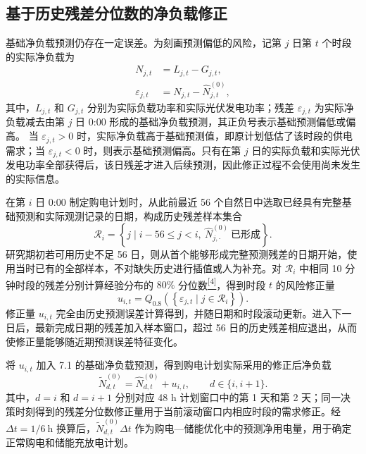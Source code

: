 \documentclass[12pt,a4paper]{ctexart}
\newcommand{\papercite}[1]{\hyperref[ref:#1]{\textsuperscript{[#1]}}}
\begin{document}
\subsection{基于历史残差分位数的净负载修正}
基础净负载预测仍存在一定误差。为刻画预测偏低的风险，记第 $j$ 日第 $t$ 个时段的实际净负载为
\begin{equation}
\begin{aligned}
N_{j,t}&=L_{j,t}-G_{j,t},\\
\varepsilon_{j,t}&=N_{j,t}-\widehat{N}_{j,t}^{(0)},
\end{aligned}
\end{equation}
其中，$L_{j,t}$ 和 $G_{j,t}$ 分别为实际负载功率和实际光伏发电功率；残差 $\varepsilon_{j,t}$ 为实际净负载减去由第 $j$ 日 0:00 形成的基础净负载预测，其正负号表示基础预测偏低或偏高。
当 $\varepsilon_{j,t}>0$ 时，实际净负载高于基础预测值，即原计划低估了该时段的供电需求；当 $\varepsilon_{j,t}<0$ 时，则表示基础预测偏高。只有在第 $j$ 日的实际负载和实际光伏发电功率全部获得后，该日残差才进入后续预测，因此修正过程不会使用尚未发生的实际信息。

\par\noindent\hspace*{2em}在第 $i$ 日 0:00 制定购电计划时，从此前最近 56 个自然日中选取已经具有完整基础预测和实际观测记录的日期，构成历史残差样本集合
\begin{equation}
\mathcal{R}_{i}=\left\{j\mid i-56\leq j<i,\ \widehat{N}_{j,\cdot}^{(0)}\ \text{已形成}\right\}.
\end{equation}
研究期初若可用历史不足 56 日，则从首个能够形成完整预测残差的日期开始，使用当时已有的全部样本，不对缺失历史进行插值或人为补充。对 $\mathcal{R}_{i}$ 中相同 10 分钟时段的残差分别计算经验分布的 $80\%$ 分位数\papercite{4}，得到时段 $t$ 的风险修正量
\begin{equation}
u_{i,t}=Q_{0.8}\left(\left\{\varepsilon_{j,t}\mid j\in\mathcal{R}_{i}\right\}\right).
\end{equation}
修正量 $u_{i,t}$ 完全由历史预测误差计算得到，并随日期和时段滚动更新。进入下一日后，最新完成日期的残差加入样本窗口，超过 56 日的历史残差相应退出，从而使修正量能够随近期预测误差特征变化。

\par\noindent\hspace*{2em}将 $u_{i,t}$ 加入 7.1 的基础净负载预测，得到购电计划实际采用的修正后净负载
\begin{equation}
\widetilde{N}_{d,t}^{(0)}=\widehat{N}_{d,t}^{(0)}+u_{i,t},\qquad d\in\{i,i+1\}.
\end{equation}
其中，$d=i$ 和 $d=i+1$ 分别对应 48 h 计划窗口中的第 1 天和第 2 天；同一决策时刻得到的残差分位数修正量用于当前滚动窗口内相应时段的需求修正。经 $\Delta t=1/6\ \mathrm{h}$ 换算后，$\widetilde{N}_{d,t}^{(0)}\Delta t$ 作为购电—储能优化中的预测净用电量，用于确定正常购电和储能充放电计划。
\end{document}
